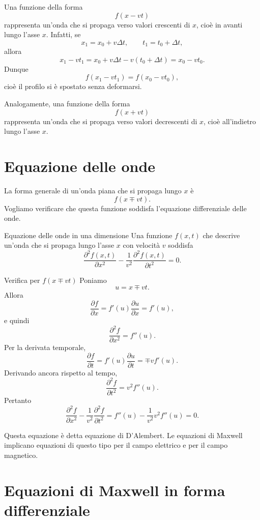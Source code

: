 \documentclass[a4paper]{article}
\begin{document}
Una funzione della forma
\[
f(x-vt)
\]
rappresenta un'onda che si propaga verso valori crescenti di \(x\), cioè in avanti lungo l'asse \(x\). Infatti, se
\[
x_1=x_0+v\Delta t,
\qquad
t_1=t_0+\Delta t,
\]
allora
\[
x_1-vt_1=x_0+v\Delta t-v(t_0+\Delta t)=x_0-vt_0.
\]
Dunque
\[
f(x_1-vt_1)=f(x_0-vt_0),
\]
cioè il profilo si è spostato senza deformarsi.

Analogamente, una funzione della forma
\[
f(x+vt)
\]
rappresenta un'onda che si propaga verso valori decrescenti di \(x\), cioè all'indietro lungo l'asse \(x\).

\section{Equazione delle onde}

La forma generale di un'onda piana che si propaga lungo \(x\) è
\[
f(x\mp vt).
\]
Vogliamo verificare che questa funzione soddisfa l'equazione differenziale delle onde.

\begin{snippettheorem}{Equazione delle onde in una dimensione}
Una funzione \(f(x,t)\) che descrive un'onda che si propaga lungo l'asse \(x\) con velocità \(v\) soddisfa
\[
    \frac{\partial^2 f(x,t)}{\partial x^2}-\frac{1}{v^2}\frac{\partial^2 f(x,t)}{\partial t^2}=0.
\]
\end{snippettheorem}

\begin{snippetproof}{Verifica per \(f(x\mp vt)\)}
Poniamo
\[
    u=x\mp vt.
\]
Allora
\[
    \frac{\partial f}{\partial x}=f'(u)\frac{\partial u}{\partial x}=f'(u),
\]
e quindi
\[
    \frac{\partial^2 f}{\partial x^2}=f''(u).
\]
Per la derivata temporale,
\[
    \frac{\partial f}{\partial t}=f'(u)\frac{\partial u}{\partial t}=\mp v f'(u).
\]
Derivando ancora rispetto al tempo,
\[
    \frac{\partial^2 f}{\partial t^2}=v^2 f''(u).
\]
Pertanto
\[
    \frac{\partial^2 f}{\partial x^2}-\frac{1}{v^2}\frac{\partial^2 f}{\partial t^2}
    =f''(u)-\frac{1}{v^2}v^2f''(u)=0.
\]
\end{snippetproof}

Questa equazione è detta equazione di D'Alembert. Le equazioni di Maxwell implicano equazioni di questo tipo per il campo elettrico e per il campo magnetico.

\section{Equazioni di Maxwell in forma differenziale}
\end{document}
